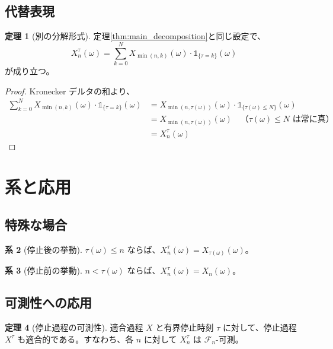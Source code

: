 \documentclass[a4paper,12pt]{ltjsarticle}
\theoremstyle{definition}
\newtheorem{theorem}{定理}[section]
\newtheorem{corollary}[theorem]{系}
\begin{document}
\subsection{代替表現}

\begin{theorem}[別の分解形式]
\label{thm:alternative_decomposition}
定理\ref{thm:main_decomposition}と同じ設定で、
\begin{equation}
X^\tau_n(\omega) = \sum_{k=0}^{N} X_{\min(n, k)}(\omega) \cdot \mathbb{1}_{\{\tau = k\}}(\omega)
\end{equation}
が成り立つ。
\end{theorem}

\begin{proof}
Kronecker デルタの和より、
\begin{align*}
\sum_{k=0}^{N} X_{\min(n, k)}(\omega) \cdot \mathbb{1}_{\{\tau = k\}}(\omega)
&= X_{\min(n, \tau(\omega))}(\omega) \cdot \mathbb{1}_{\{\tau(\omega) \leq N\}}(\omega) \\
&= X_{\min(n, \tau(\omega))}(\omega) \quad \text{（$\tau(\omega) \leq N$ は常に真）}\\
&= X^\tau_n(\omega)
\end{align*}
\end{proof}

\section{系と応用}

\subsection{特殊な場合}

\begin{corollary}[停止後の挙動]
$\tau(\omega) \leq n$ ならば、$X^\tau_n(\omega) = X_{\tau(\omega)}(\omega)$。
\end{corollary}

\begin{corollary}[停止前の挙動]
$n < \tau(\omega)$ ならば、$X^\tau_n(\omega) = X_n(\omega)$。
\end{corollary}

\subsection{可測性への応用}

\begin{theorem}[停止過程の可測性]
適合過程 $X$ と有界停止時刻 $\tau$ に対して、停止過程 $X^\tau$ も適合的である。すなわち、各 $n$ に対して $X^\tau_n$ は $\mathcal{F}_n$-可測。
\end{theorem}
\end{document}

